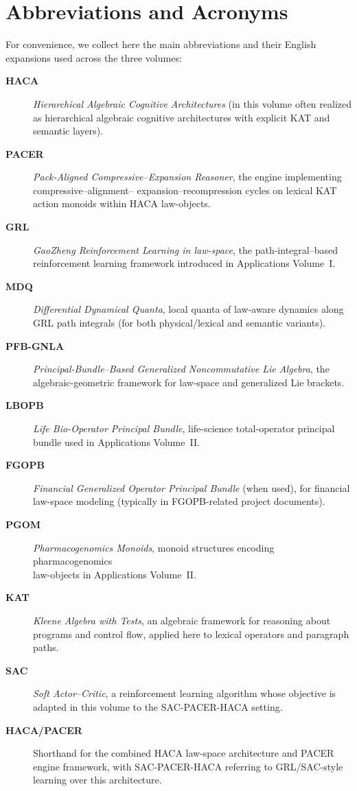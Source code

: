\documentclass[11pt]{book}
\theoremstyle{plain}
\theoremstyle{definition}
\theoremstyle{remark}
\begin{document}
\section*{Abbreviations and Acronyms}

For convenience, we collect here the main abbreviations and their
English expansions used across the three volumes:

\begin{description}
  \item[\textbf{HACA}] \emph{Hierarchical Algebraic Cognitive
        Architectures} (in this volume often realized as hierarchical
        algebraic cognitive architectures with explicit KAT and
        semantic layers).
  \item[\textbf{PACER}] \emph{Pack-Aligned Compressive–Expansion
        Reasoner}, the engine implementing \\compressive–alignment–
        expansion–recompression cycles on lexical KAT action monoids
        within HACA law-objects.
  \item[\textbf{GRL}] \emph{GaoZheng Reinforcement Learning in
        law-space}, the path-integral–based reinforcement learning
        framework introduced in Applications Volume~I.
  \item[\textbf{MDQ}] \emph{Differential Dynamical Quanta}, local
        quanta of law-aware dynamics along GRL path integrals (for
        both physical/lexical and semantic variants).
  \item[\textbf{PFB-GNLA}] \emph{Principal-Bundle–Based Generalized
        Noncommutative Lie Algebra}, the algebraic-geometric framework
        for law-space and generalized Lie brackets.
  \item[\textbf{LBOPB}] \emph{Life Bio-Operator Principal Bundle},
        life-science total-operator principal bundle used in
        Applications Volume~II.
  \item[\textbf{FGOPB}] \emph{Financial Generalized Operator Principal
        Bundle} (when used), for financial law-space modeling (typically
        in FGOPB-related project documents).
  \item[\textbf{PGOM}] \emph{Pharmacogenomics Monoids}, monoid
        structures encoding pharmacogenomics \\law-objects in
        Applications Volume~II.
  \item[\textbf{KAT}] \emph{Kleene Algebra with Tests}, an algebraic
        framework for reasoning about programs and control flow,
        applied here to lexical operators and paragraph paths.
  \item[\textbf{SAC}] \emph{Soft Actor–Critic}, a reinforcement
        learning algorithm whose objective is adapted in this volume
        to the SAC-PACER-HACA setting.
  \item[\textbf{HACA/PACER}] Shorthand for the combined HACA law-space
        architecture and PACER engine framework, with SAC-PACER-HACA
        referring to GRL/SAC-style learning over this architecture.
\end{description}
\end{document}
